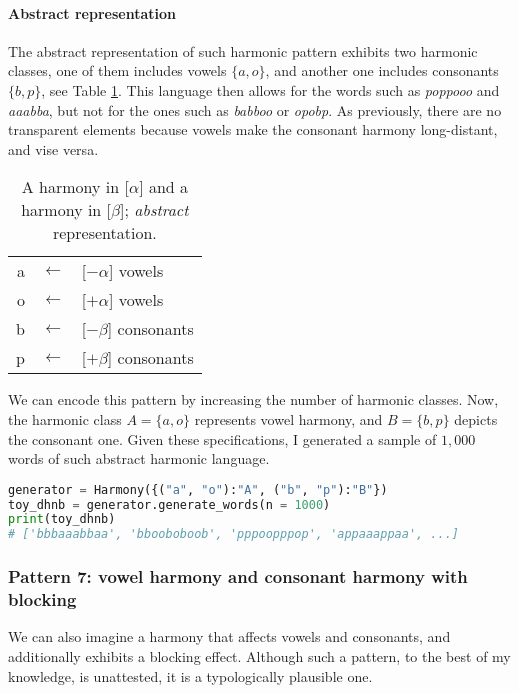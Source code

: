 \paragraph{Abstract representation}

The abstract representation of such harmonic pattern exhibits two harmonic classes, one of them includes vowels $\{a, o\}$, and another one includes consonants $\{b, p\}$, see Table \ref{dhnbmap}.
This language then allows for the words such as \emph{poppooo} and \emph{aaabba}, but not for the ones such as \emph{babboo} or \emph{opobp}.
As previously, there are no transparent elements because vowels make the consonant harmony long-distant, and vise versa.

\begin{table}[h!]
\begin{center}
\begin{tabular}{rcl}
a & $\leftarrow$ & {[}$-\alpha${]} vowels \\
o & $\leftarrow$ & {[}$+\alpha${]} vowels \\
b & $\leftarrow$ & {[}$-\beta${]} consonants \\
p & $\leftarrow$ & {[}$+\beta${]} consonants
\end{tabular}
\end{center}
\caption{A harmony in {[}$\alpha${]} and a harmony in {[}$\beta${]}; \emph{abstract} representation.}
\label{dhnbmap}
\end{table}

We can encode this pattern by increasing the number of harmonic classes.
Now, the harmonic class $A = \{a, o\}$ represents vowel harmony, and $B = \{b, p\}$ depicts the consonant one.
Given these specifications, I generated a sample of $1,000$ words of such abstract harmonic language.


\begin{lstlisting}[language=Python]
generator = Harmony({("a", "o"):"A", ("b", "p"):"B"})
toy_dhnb = generator.generate_words(n = 1000)
print(toy_dhnb)
# ['bbbaaabbaa', 'bbooboboob', 'pppoopppop', 'appaaappaa', ...]
\end{lstlisting}


\subsubsection{Pattern 7: vowel harmony and consonant harmony with blocking}

We can also imagine a harmony that affects vowels and consonants, and additionally exhibits a blocking effect.
Although such a pattern, to the best of my knowledge, is unattested, it is a typologically plausible one.

